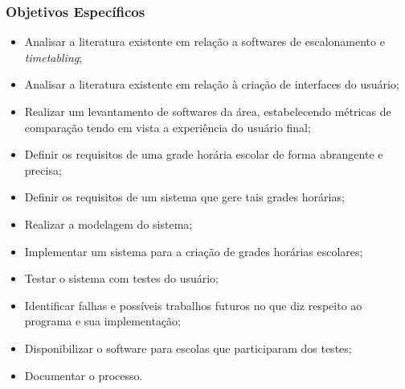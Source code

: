 \documentclass{subfiles}
\begin{document}
	\subsubsection{Objetivos Específicos}

		\begin{itemize}
			\item Analisar a literatura existente em relação a softwares de escalonamento e \textit{timetabling};
			\item Analisar a literatura existente em relação à criação de interfaces do usuário;
			\item Realizar um levantamento de softwares da área, estabelecendo métricas de comparação tendo em vista a experiência do usuário final;
			\item Definir os requisitos de uma grade horária escolar de forma abrangente e precisa;
			\item Definir os requisitos de um sistema que gere tais grades horárias;
			\item Realizar a modelagem do sistema;
			\item Implementar um sistema para a criação de grades horárias escolares;
			\item Testar o sistema com testes do usuário;
			\item Identificar falhas e possíveis trabalhos futuros no que diz respeito ao programa e sua implementação;
			\item Disponibilizar o software para escolas que participaram dos testes;
			\item Documentar o processo.
		\end{itemize}
\end{document}
